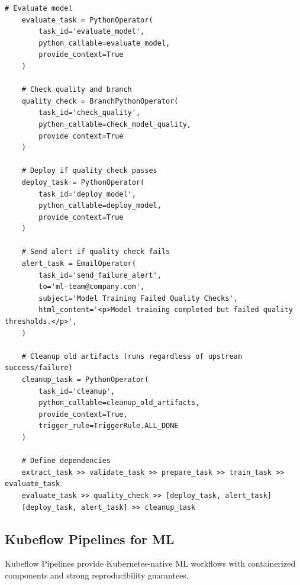 \begin{lstlisting}[style=python, caption=Comprehensive Airflow ML pipeline with error handling]
    # Evaluate model
    evaluate_task = PythonOperator(
        task_id='evaluate_model',
        python_callable=evaluate_model,
        provide_context=True
    )

    # Check quality and branch
    quality_check = BranchPythonOperator(
        task_id='check_quality',
        python_callable=check_model_quality,
        provide_context=True
    )

    # Deploy if quality check passes
    deploy_task = PythonOperator(
        task_id='deploy_model',
        python_callable=deploy_model,
        provide_context=True
    )

    # Send alert if quality check fails
    alert_task = EmailOperator(
        task_id='send_failure_alert',
        to='ml-team@company.com',
        subject='Model Training Failed Quality Checks',
        html_content='<p>Model training completed but failed quality thresholds.</p>',
    )

    # Cleanup old artifacts (runs regardless of upstream success/failure)
    cleanup_task = PythonOperator(
        task_id='cleanup',
        python_callable=cleanup_old_artifacts,
        provide_context=True,
        trigger_rule=TriggerRule.ALL_DONE
    )

    # Define dependencies
    extract_task >> validate_task >> prepare_task >> train_task >> evaluate_task
    evaluate_task >> quality_check >> [deploy_task, alert_task]
    [deploy_task, alert_task] >> cleanup_task
\end{lstlisting}

\subsection{Kubeflow Pipelines for ML}

Kubeflow Pipelines provide Kubernetes-native ML workflows with containerized components and strong reproducibility guarantees.

